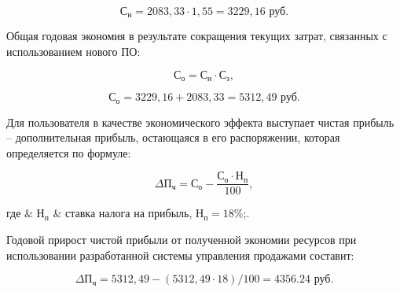 \begin{equation}
  \text{С}_\text{н} = 2083,33 \cdot 1,55 = 3229,16 \text{ руб.}
\end{equation}

Общая годовая экономия в результате сокращения текущих затрат, связанных с использованием нового ПО:

\begin{equation}
  \text{С}_\text{о} = \text{С}_\text{н} \cdot \text{С}_\text{з},
\end{equation}

\begin{equation}
  \text{С}_\text{о} = 3229,16 + 2083,33 = 5312,49 \text{ руб.}
\end{equation}

Для пользователя в качестве экономического эффекта выступает чистая прибыль – дополнительная прибыль, остающаяся в его
распоряжении, которая определяется по формуле:

\begin{equation}
  \Delta\text{П}_\text{ч} = \text{С}_\text{о} - \frac{\text{С}_\text{о} \cdot \text{Н}_\text{п}}{100},
\end{equation}
\begin{explanation}
  где & $ \text{Н}_\text{п} $ & ставка налога на прибыль, $ \text{Н}_\text{п} = 18\% $;.
\end{explanation}

Годовой прирост чистой прибыли от полученной экономии ресурсов при использовании разработанной системы управления
продажами составит:

\begin{equation}
  \Delta\text{П}_\text{ч} = 5312,49 - (5312,49 \cdot 18)/100 = 4356.24 \text{ руб.}
\end{equation}

